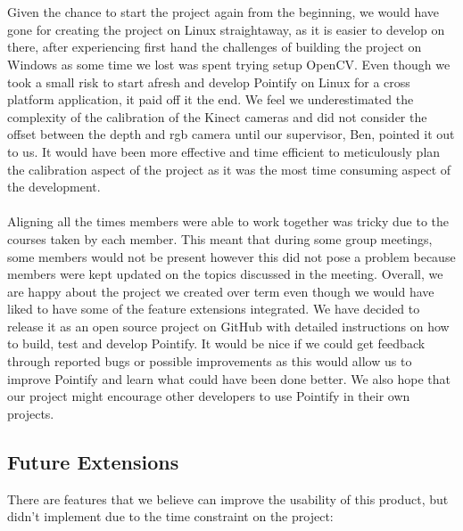 \documentclass{article}
\begin{document}
\\\\
Given the chance to start the project again from the beginning, we would have gone for creating the project on Linux straightaway, as it is easier to develop on there, after experiencing first hand the challenges of building the project on Windows as some time we lost was spent trying setup OpenCV. Even though we took a small risk to start afresh and develop Pointify on Linux for a cross platform application, it paid off it the end. We feel we underestimated the complexity of the calibration of the Kinect cameras and did not consider the offset between the depth and rgb camera until our supervisor, Ben, pointed it out to us. It would have been more effective and time efficient to meticulously plan the calibration aspect of the project as it was the most time consuming aspect of the development.
\\\\
Aligning all the times members were able to work together was tricky due to the courses taken by each member. This meant that during some group meetings, some members would not be present however this did not pose a problem because members were kept updated on the topics discussed in the meeting. Overall, we are happy about the project we created over term even though we would have liked to have some of the feature extensions integrated. We have decided to release it as an open source project on GitHub with detailed instructions on how to build, test and develop Pointify. It would be nice if we could get feedback through reported bugs or possible improvements as this would allow us to improve Pointify and learn what could have been done better. We also hope that our project might encourage other developers to use Pointify in their own projects. 
\newpage
\subsection{Future Extensions}
There are features that we believe can improve the usability of this product, but didn't implement due to the time constraint on the project:
\end{document}

